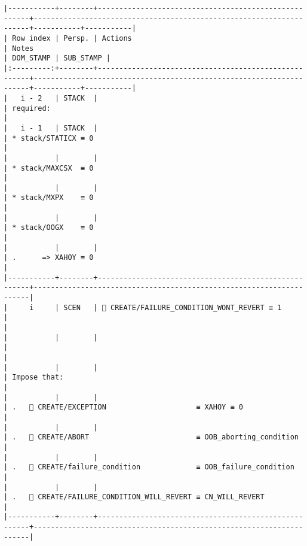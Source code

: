 \documentclass[varwidth=\maxdimen,margin=0.5cm,multi={verbatim}]{standalone}
\begin{document}
\begin{verbatim}
|-----------+--------+------------------------------------------------------+---------------------------------------------------------------------+-----------+-----------|
| Row index | Persp. | Actions                                              | Notes                                                               | DOM_STAMP | SUB_STAMP |
|:---------:+--------+------------------------------------------------------+---------------------------------------------------------------------+-----------+-----------|
|   i - 2   | STACK  |                                                      | required:                                                           |
|   i - 1   | STACK  |                                                      | * stack/STATICX ≡ 0                                                 |
|           |        |                                                      | * stack/MAXCSX  ≡ 0                                                 |
|           |        |                                                      | * stack/MXPX    ≡ 0                                                 |
|           |        |                                                      | * stack/OOGX    ≡ 0                                                 |
|           |        |                                                      | .      => XAHOY ≡ 0                                                 |
|-----------+--------+------------------------------------------------------+---------------------------------------------------------------------|
|     i     | SCEN   |  CREATE/FAILURE_CONDITION_WONT_REVERT ≡ 1           |                                                                     |
|           |        |                                                      |                                                                     |
|           |        |                                                      | Impose that:                                                        |
|           |        |                                                      | .    CREATE/EXCEPTION                     ≡ XAHOY ≡ 0              |
|           |        |                                                      | .    CREATE/ABORT                         ≡ OOB_aborting_condition |
|           |        |                                                      | .    CREATE/failure_condition             ≡ OOB_failure_condition  |
|           |        |                                                      | .    CREATE/FAILURE_CONDITION_WILL_REVERT ≡ CN_WILL_REVERT         |
|-----------+--------+------------------------------------------------------+---------------------------------------------------------------------|

\end{verbatim}
\end{document}
